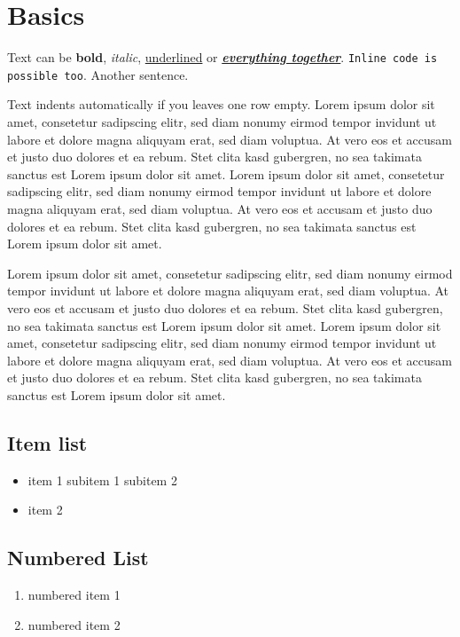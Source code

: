 
\section{Basics}
Text can be \textbf{bold}, \textit{italic}, \underline{underlined} or \textbf{\textit{\underline{everything together}}}. \texttt{Inline code is possible too}. Another sentence.

Text indents automatically if you leaves one row empty. Lorem ipsum dolor sit amet, consetetur sadipscing elitr, sed diam nonumy eirmod tempor invidunt ut labore et dolore magna aliquyam erat, sed diam voluptua. At vero eos et accusam et justo duo dolores et ea rebum. Stet clita kasd gubergren, no sea takimata sanctus est Lorem ipsum dolor sit amet. Lorem ipsum dolor sit amet, consetetur sadipscing elitr, sed diam nonumy eirmod tempor invidunt ut labore et dolore magna aliquyam erat, sed diam voluptua. At vero eos et accusam et justo duo dolores et ea rebum. Stet clita kasd gubergren, no sea takimata sanctus est Lorem ipsum dolor sit amet. \cite{Albrecht2010}

Lorem ipsum dolor sit amet, consetetur sadipscing elitr, sed diam nonumy eirmod tempor invidunt ut labore et dolore magna aliquyam erat, sed diam voluptua. At vero eos et accusam et justo duo dolores et ea rebum. Stet clita kasd gubergren, no sea takimata sanctus est Lorem ipsum dolor sit amet. Lorem ipsum dolor sit amet, consetetur sadipscing elitr, sed diam nonumy eirmod tempor invidunt ut labore et dolore magna aliquyam erat, sed diam voluptua. At vero eos et accusam et justo duo dolores et ea rebum. Stet clita kasd gubergren, no sea takimata sanctus est Lorem ipsum dolor sit amet. \cite{hdl_routing} \cite{light_leakage_color}

\subsection{Item list}
\begin{itemize}
	\item item 1
	\subitem subitem 1
	\subitem subitem 2
	\item item 2
\end{itemize}

\subsection{Numbered List}
\begin{enumerate}
	\item numbered item 1
	\item numbered item 2
\end{enumerate}

